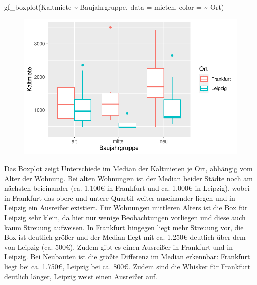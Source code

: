 \documentclass[
  a4paper,
  DIV=11]{scrartcl}
\newenvironment{Shaded}{\begin{snugshade}}{\end{snugshade}}
\newcommand{\AttributeTok}[1]{\textcolor[rgb]{0.40,0.45,0.13}{#1}}
\newcommand{\FunctionTok}[1]{\textcolor[rgb]{0.28,0.35,0.67}{#1}}
\newcommand{\NormalTok}[1]{\textcolor[rgb]{0.00,0.23,0.31}{#1}}
\newcommand{\SpecialCharTok}[1]{\textcolor[rgb]{0.37,0.37,0.37}{#1}}
\begin{document}
\begin{Shaded}
\begin{Highlighting}[]
\FunctionTok{gf\_boxplot}\NormalTok{(Kaltmiete }\SpecialCharTok{\textasciitilde{}}\NormalTok{ Baujahrgruppe, }\AttributeTok{data =}\NormalTok{ mieten, }\AttributeTok{color =} \SpecialCharTok{\textasciitilde{}}\NormalTok{ Ort)}
\end{Highlighting}
\end{Shaded}

\begin{figure}[H]

{\centering \includegraphics{Mietmodellierung_files/figure-pdf/unnamed-chunk-16-1.pdf}

}

\end{figure}

Das Boxplot zeigt Unterschiede im Median der Kaltmieten je Ort, abhängig
vom Alter der Wohnung. Bei alten Wohnungen ist der Median beider Städte
noch am nächsten beieinander (ca. 1.100€ in Frankfurt und ca. 1.000€ in
Leipzig), wobei in Frankfurt das obere und untere Quartil weiter
auseinander liegen und in Leipzig ein Ausreißer existiert. Für Wohnungen
mittleren Alters ist die Box für Leipzig sehr klein, da hier nur wenige
Beobachtungen vorliegen und diese auch kaum Streuung aufweisen. In
Frankfurt hingegen liegt mehr Streuung vor, die Box ist deutlich größer
und der Median liegt mit ca. 1.250€ deutlich über dem von Leipzig (ca.
500€). Zudem gibt es einen Ausreißer in Frankfurt und in Leipzig. Bei
Neubauten ist die größte Differenz im Median erkennbar: Frankfurt liegt
bei ca. 1.750€, Leipzig bei ca. 800€. Zudem sind die Whisker für
Frankfurt deutlich länger, Leipzig weist einen Ausreißer auf.
\end{document}
